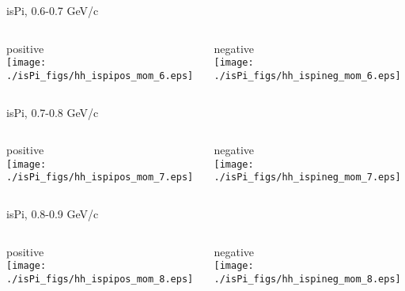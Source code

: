 \documentclass[compress]{beamer} %
\begin{document}

\begin{frame}{isPi, 0.6-0.7 GeV/c}
\begin{columns}
\begin{column}{.5\linewidth}
positive \\
\texttt{[image: ./isPi\_figs/hh\_ispipos\_mom\_6.eps]} \\
\end{column}
\begin{column}{.5\linewidth}
negative \\
\texttt{[image: ./isPi\_figs/hh\_ispineg\_mom\_6.eps]} \\
\end{column}
\end{columns}
\end{frame}


\begin{frame}{isPi, 0.7-0.8 GeV/c}
\begin{columns}
\begin{column}{.5\linewidth}
positive \\
\texttt{[image: ./isPi\_figs/hh\_ispipos\_mom\_7.eps]} \\
\end{column}
\begin{column}{.5\linewidth}
negative \\
\texttt{[image: ./isPi\_figs/hh\_ispineg\_mom\_7.eps]} \\
\end{column}
\end{columns}
\end{frame}


\begin{frame}{isPi, 0.8-0.9 GeV/c}
\begin{columns}
\begin{column}{.5\linewidth}
positive \\
\texttt{[image: ./isPi\_figs/hh\_ispipos\_mom\_8.eps]} \\
\end{column}
\begin{column}{.5\linewidth}
negative \\
\texttt{[image: ./isPi\_figs/hh\_ispineg\_mom\_8.eps]} \\
\end{column}
\end{columns}
\end{frame}
\end{document}
